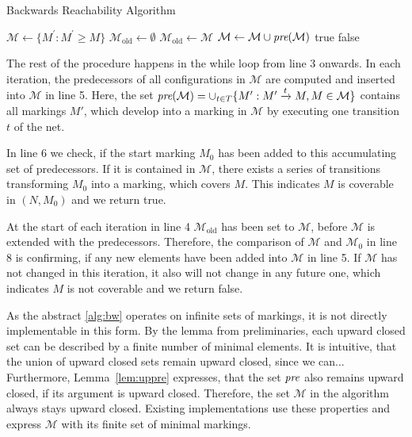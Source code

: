 \begin{algorithm}[htb]
\caption{Backwards Reachability Algorithm}\label{alg:bw}
\begin{algorithmic}[1]
\State $\mathcal{M} \gets \{ M^{'} : M^{'} \ge M \}$
\State $\mathcal{M}_{\text{old}} \gets \emptyset$
	\State $\mathcal{M}_{\text{old}} \gets \mathcal{M}$
	\State $\mathcal{M} \gets \mathcal{M} \cup \operatorname{\textit{pre}}(\mathcal{M})$
	\Return true
\EndIf
{}
    \Return false
\EndIf
\EndWhile
\end{algorithmic}
\end{algorithm}

The rest of the procedure happens in the while loop from line 3 onwards. In each iteration, the predecessors of all configurations in $\mathcal{M}$ are computed and inserted into $\mathcal{M}$ in line 5. 
Here, the set $\operatorname{\textit{pre}}(\mathcal{M}) = \cup_{t \in T} \{M': M' \xrightarrow{t} M, M \in \mathcal{M} \}$ contains all markings $M'$, which develop into a marking in $\mathcal{M}$ by executing one transition $t$ of the net.
\par
In line 6 we check, if the start marking $M_{0}$ has been added to this accumulating set of predecessors. If it is contained in $\mathcal{M}$, there exists a series of transitions transforming $M_{0}$ into a marking, which covers $M$. This indicates $M$ is coverable in $(N,M_{0})$ and we return true. 
\par
At the start of each iteration in line 4 $\mathcal{M}_{\text{old}}$ has been set to $\mathcal{M}$, before $\mathcal{M}$ is extended with the predecessors. Therefore, the comparison of $\mathcal{M}$ and $\mathcal{M}_{0}$ in line 8 is confirming, if any new elements have been added into $\mathcal{M}$ in line 5. If $\mathcal{M}$ has not changed in this iteration, it also will not change in any future one, which indicates $M$ is not coverable and we return false.
\par
As the abstract \autoref{alg:bw} operates on infinite sets of markings, it is not directly implementable in this form. 
By the lemma from preliminaries, each upward closed set can be described by a finite number of minimal elements. It is intuitive, that the union of upward closed sets remain upward closed, since we can... Furthermore, Lemma~\autoref{lem:uppre} expresses, that the set $\operatorname{\textit{pre}}$ also remains upward closed, if its argument is upward closed. Therefore, the set $\mathcal{M}$ in the algorithm always stays upward closed. Existing implementations use these properties and express $\mathcal{M}$ with its finite set of minimal markings.

